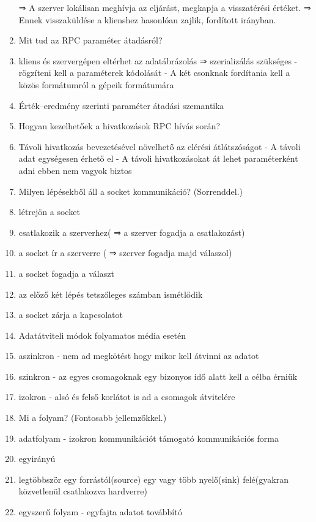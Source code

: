 \documentclass[twoside, a4paper, 12pt]{article}
\begin{document}
\begin{enumerate}
        ⇒ A szerver lokálisan meghívja az eljárást, megkapja a visszatérési értéket.
        ⇒ Ennek visszaküldése a klienshez hasonlóan zajlik, fordított irányban.
    \item  Mit tud az RPC paraméter átadásról?
    \item kliens és szervergépen eltérhet az adatábrázolás ⇒ szerializálás szükséges
        - rögzíteni kell a paraméterek kódolását
        - A két csonknak fordítania kell a közös formátumról a gépeik formátumára
    \item Érték–eredmény szerinti paraméter átadási szemantika
    \item  Hogyan kezelhetőek a hivatkozások RPC hívás során?
    \item Távoli hivatkozás bevezetésével növelhető az elérési átlátszóságot
        - A távoli adat egységesen érhető el
        - A távoli hivatkozásokat át lehet paraméterként adni
        ebben nem vagyok biztos
    \item  Milyen lépésekből áll a socket kommunikáció? (Sorrenddel.)
    \item létrejön a socket
    \item csatlakozik a szerverhez( ⇒ a szerver fogadja a csatlakozást)
    \item a socket ír a szerverre ( ⇒ szerver fogadja majd válaszol)
    \item a socket fogadja a választ
    \item az előző két lépés tetszőleges számban ismétlődik
    \item a socket zárja a kapcsolatot
    \item  Adatátviteli módok folyamatos média esetén
    \item aszinkron
        - nem ad megkötést hogy mikor kell átvinni az adatot
    \item szinkron
        - az egyes csomagoknak egy bizonyos idő alatt kell a célba érniük
    \item izokron 
        - alsó és felső korlátot is ad a csomagok átvitelére
    \item  Mi a folyam? (Fontosabb jellemzőkkel.)
    \item adatfolyam
        - izokron kommunikációt támogató kommunikációs forma
    \item egyirányú
    \item legtöbbször egy forrástól(source) egy vagy több nyelő(sink) felé(gyakran közvetlenül csatlakozva hardverre)
    \item egyszerű folyam
        - egyfajta adatot továbbító

\end{enumerate}
\end{document}
